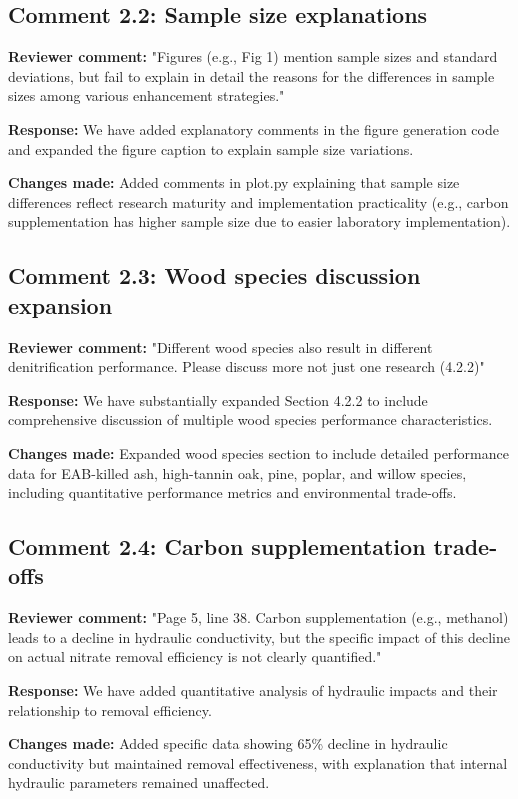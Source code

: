 \documentclass[12pt,a4paper]{article}
\begin{document}
\subsection{Comment 2.2: Sample size explanations}
\textbf{Reviewer comment:} "Figures (e.g., Fig 1) mention sample sizes and standard deviations, but fail to explain in detail the reasons for the differences in sample sizes among various enhancement strategies."

\textbf{Response:} We have added explanatory comments in the figure generation code and expanded the figure caption to explain sample size variations.

\textbf{Changes made:} Added comments in plot.py explaining that sample size differences reflect research maturity and implementation practicality (e.g., carbon supplementation has higher sample size due to easier laboratory implementation).

\subsection{Comment 2.3: Wood species discussion expansion}
\textbf{Reviewer comment:} "Different wood species also result in different denitrification performance. Please discuss more not just one research (4.2.2)"

\textbf{Response:} We have substantially expanded Section 4.2.2 to include comprehensive discussion of multiple wood species performance characteristics.

\textbf{Changes made:} Expanded wood species section to include detailed performance data for EAB-killed ash, high-tannin oak, pine, poplar, and willow species, including quantitative performance metrics and environmental trade-offs.

\subsection{Comment 2.4: Carbon supplementation trade-offs}
\textbf{Reviewer comment:} "Page 5, line 38. Carbon supplementation (e.g., methanol) leads to a decline in hydraulic conductivity, but the specific impact of this decline on actual nitrate removal efficiency is not clearly quantified."

\textbf{Response:} We have added quantitative analysis of hydraulic impacts and their relationship to removal efficiency.

\textbf{Changes made:} Added specific data showing 65\% decline in hydraulic conductivity but maintained removal effectiveness, with explanation that internal hydraulic parameters remained unaffected.
\end{document}

